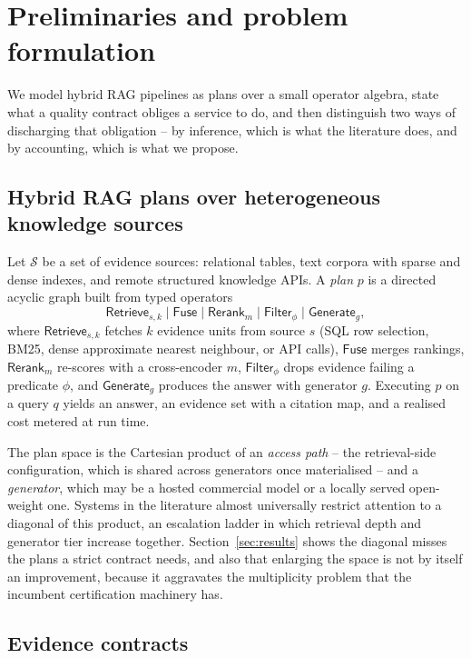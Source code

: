 \section{Preliminaries and problem formulation}
\label{sec:prelim}

We model hybrid RAG pipelines as plans over a small operator algebra,
state what a quality contract obliges a service to do, and then
distinguish two ways of discharging that obligation -- by inference,
which is what the literature does, and by accounting, which is what we
propose.

\subsection{Hybrid RAG plans over heterogeneous knowledge sources}
\label{sec:algebra}

Let $\mathcal{S}$ be a set of evidence sources: relational tables, text
corpora with sparse and dense indexes, and remote structured knowledge
APIs. A \emph{plan} $p$ is a directed acyclic graph built from typed
operators
\[
\textsf{Retrieve}_{s,k} \mid \textsf{Fuse} \mid \textsf{Rerank}_m
\mid \textsf{Filter}_\phi \mid \textsf{Generate}_g ,
\]
where $\textsf{Retrieve}_{s,k}$ fetches $k$ evidence units from source
$s$ (SQL row selection, BM25, dense approximate nearest neighbour, or
API calls), $\textsf{Fuse}$ merges rankings, $\textsf{Rerank}_m$
re-scores with a cross-encoder $m$, $\textsf{Filter}_\phi$ drops
evidence failing a predicate $\phi$, and $\textsf{Generate}_g$ produces
the answer with generator $g$. Executing $p$ on a query $q$ yields an
answer, an evidence set with a citation map, and a realised cost
metered at run time.

The plan space is the Cartesian product of an \emph{access path} -- the
retrieval-side configuration, which is shared across generators once
materialised -- and a \emph{generator}, which may be a hosted commercial
model or a locally served open-weight one. Systems in the literature
almost universally restrict attention to a diagonal of this product, an
escalation ladder in which retrieval depth and generator tier increase
together. Section~\ref{sec:results} shows the diagonal misses the plans
a strict contract needs, and also that enlarging the space is not by
itself an improvement, because it aggravates the multiplicity problem
that the incumbent certification machinery has.

\subsection{Evidence contracts}

